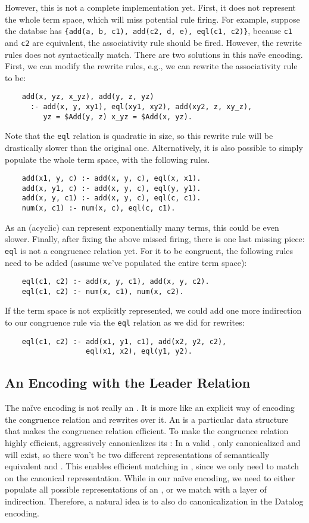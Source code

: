 However, this is not a complete \egraph implementation yet.
First, it does not represent the whole term space, 
 which will miss potential rule firing.
For example, suppose the databse has \verb|{add(a, b, c1), add(c2, d, e), eql(c1, c2)}|,
 because \verb|c1| and \verb|c2| are equivalent, 
 the associativity rule should be fired.
However, the rewrite rules does not syntactically match.
There are two solutions in this na\"ve encoding.
First, we can modify the rewrite rules, e.g.,
 we can rewrite the associativity rule to be:
\begin{verbatim}
    add(x, yz, x_yz), add(y, z, yz) 
      :- add(x, y, xy1), eql(xy1, xy2), add(xy2, z, xy_z), 
         yz = $Add(y, z) x_yz = $Add(x, yz).
\end{verbatim}
Note that the \verb|eql| relation is quadratic in size,
 so this rewrite rule will be drastically slower than the original one.
Alternatively,
 it is also possible to simply populate the whole term space, with the following rules.
\begin{verbatim}
    add(x1, y, c) :- add(x, y, c), eql(x, x1).
    add(x, y1, c) :- add(x, y, c), eql(y, y1).
    add(x, y, c1) :- add(x, y, c), eql(c, c1).
    num(x, c1) :- num(x, c), eql(c, c1).
\end{verbatim}
As an (acyclic) \egraph can represent exponentially many terms,
 this could be even slower.
Finally, after fixing the above missed firing, there is one last missing piece:
 \verb|eql| is not a congruence relation yet.
For it to be congruent,
 the following rules need to be added (assume we've populated the entire term space):
\begin{verbatim}
    eql(c1, c2) :- add(x, y, c1), add(x, y, c2).
    eql(c1, c2) :- num(x, c1), num(x, c2).
\end{verbatim}
If the term space is not explicitly represented,
 we could add one more indirection to our congruence rule 
 via the \verb|eql| relation as
 we did for rewrites:
\begin{verbatim}
    eql(c1, c2) :- add(x1, y1, c1), add(x2, y2, c2),
                   eql(x1, x2), eql(y1, y2).
\end{verbatim}

\subsection{An Encoding with the Leader Relation}\label{sec:leader}

The na\"ive encoding is not really an \egraph.
It is more like an explicit way of encoding the congruence relation
 and rewrites over it.
An \egraph is a particular data structure that 
 makes the congruence relation efficient.
To make the congruence relation highly efficient,
 \egraph aggressively canonicalizes its \enodes:
In a valid \egraph,
 only canonicalized \enodes and \eclass will exist,
 so there won't be two different representations of 
 semantically equivalent \enodes and \eclasses.
This enables efficient matching in \egraph, 
 since we only need to match on the canonical representation.
While in our na\"ive encoding, 
 we need to either populate all possible representations of an \enode,
 or we match with a layer of indirection.
Therefore, 
 a natural idea is to also do canonicalization in the Datalog encoding.

